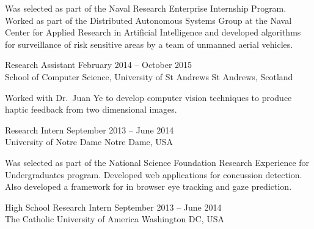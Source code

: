\documentclass[line,margin]{cv}
\begin{document}
\begin{resume}
\begin{adjustwidth}{2.5em}{2.5em}
    Was selected as part of the Naval Research Enterprise Internship Program.
    Worked as part of the Distributed Autonomous Systems Group at the Naval
    Center for Applied Research in Artificial Intelligence and developed
    algorithms for surveillance of risk sensitive areas by a team of unmanned
    aerial vehicles.

\end{adjustwidth}

Research Assistant
\hfill February 2014 -- October 2015 \\
School of Computer Science, University of St Andrews \hfill St Andrews,
Scotland

\begin{adjustwidth}{2.5em}{2.5em}

    Worked with Dr.\ Juan Ye to develop computer vision techniques to produce
    haptic feedback from two dimensional images.

\end{adjustwidth}

% 
% 
% 

Research Intern
\hfill September 2013 -- June 2014 \\
University of Notre Dame \hfill Notre Dame, USA

\begin{adjustwidth}{2.5em}{2.5em}

    Was selected as part of the National Science Foundation Research Experience
    for Undergraduates program. Developed web applications for concussion
    detection. Also developed a framework for in browser eye tracking and gaze
    prediction.

\end{adjustwidth}

High School Research Intern
\hfill September 2013 -- June 2014 \\
The Catholic University of America \hfill Washington DC, USA

\begin{adjustwidth}{2.5em}{2.5em}


\end{adjustwidth}
\end{resume}
\end{document}
